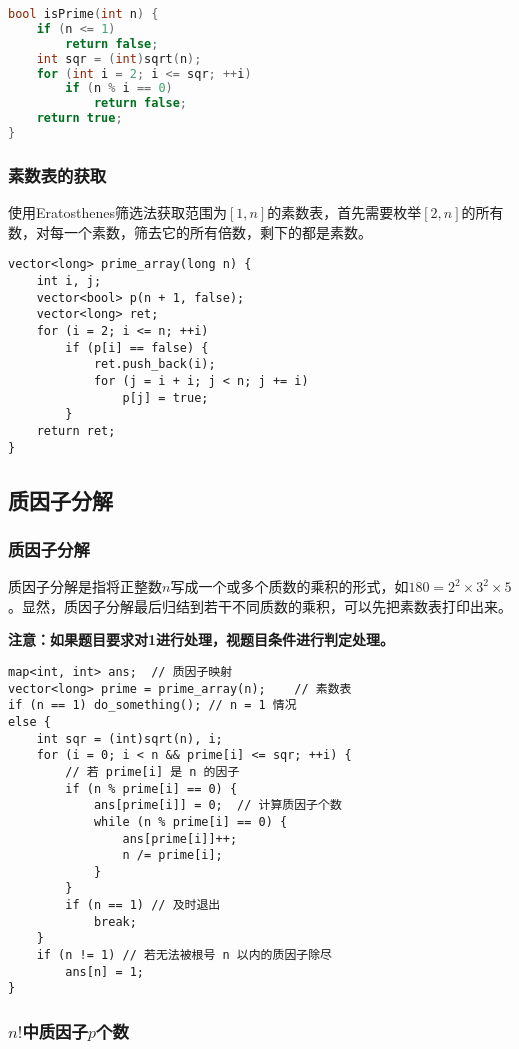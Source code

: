 \begin{lstlisting}[language=c++]
bool isPrime(int n) {
	if (n <= 1)
		return false;
	int sqr = (int)sqrt(n);
	for (int i = 2; i <= sqr; ++i)
		if (n % i == 0)
			return false;
	return true;
}
\end{lstlisting}

\subsubsection{素数表的获取}

使用Eratosthenes筛选法获取范围为$[1,n]$的素数表，首先需要枚举$[2,n]$的所有数，对每一个素数，筛去它的所有倍数，剩下的都是素数。

\begin{lstlisting}
vector<long> prime_array(long n) {
	int i, j;
	vector<bool> p(n + 1, false);
	vector<long> ret;
	for (i = 2; i <= n; ++i)
		if (p[i] == false) {
			ret.push_back(i);
			for (j = i + i; j < n; j += i)
				p[j] = true;
		}
	return ret;
}
\end{lstlisting}

\subsection{质因子分解}

\subsubsection{质因子分解}

质因子分解是指将正整数$n$写成一个或多个质数的乘积的形式，如$180=2^2\times3^2\times5$。显然，质因子分解最后归结到若干不同质数的乘积，可以先把素数表打印出来。

\textbf{注意：如果题目要求对1进行处理，视题目条件进行判定处理。}

\begin{lstlisting}
map<int, int> ans;	// 质因子映射
vector<long> prime = prime_array(n);	// 素数表
if (n == 1)	do_something();	// n = 1 情况
else {
	int sqr = (int)sqrt(n), i;
	for (i = 0; i < n && prime[i] <= sqr; ++i) {
		// 若 prime[i] 是 n 的因子
		if (n % prime[i] == 0) {
			ans[prime[i]] = 0;	// 计算质因子个数
			while (n % prime[i] == 0) {
				ans[prime[i]]++;
				n /= prime[i];
			}
		}
		if (n == 1)	// 及时退出
			break;
	}
	if (n != 1) // 若无法被根号 n 以内的质因子除尽
		ans[n] = 1;
}
\end{lstlisting}

\subsubsection{$n!$中质因子$p$个数}

